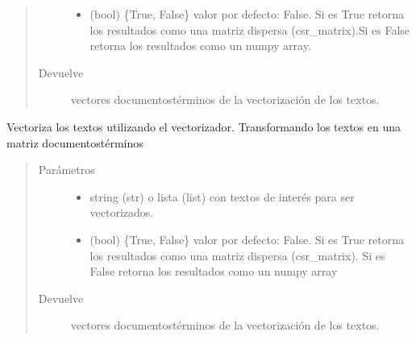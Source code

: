 \documentclass[letterpaper,10pt,openany,spanish]{sphinxmanual}
\begin{document}
\begin{fulllineitems}
\begin{fulllineitems}
\begin{quote}
\begin{description}
\begin{itemize}
\item {} 
 \textendash{} (bool) \{True, False\} valor por defecto: False. 
Si es True retorna los resultados como una matriz dispersa 
(csr\_matrix).Si es False retorna los resultados como un numpy array.

\end{itemize}

\item[{Devuelve}] \leavevmode
vectores documentos\sphinxhyphen{}términos de la vectorización de los textos.

\end{description}\end{quote}

\end{fulllineitems}


\begin{fulllineitems}
\label{\detokenize{funciones/vectorizacion:vectorizacion.VectorizadorHash.vectorizar}}
Vectoriza los textos utilizando el vectorizador. 
Transformando los textos en una matriz documentos\sphinxhyphen{}términos
\begin{quote}\begin{description}
\item[{Parámetros}] \leavevmode\begin{itemize}
\item {} 
 \textendash{} string (str) o lista (list) con textos de interés 
para ser vectorizados.

\item {} 
 \textendash{} (bool) \{True, False\} valor por defecto: False. 
Si es True retorna los resultados como una matriz dispersa 
(csr\_matrix). Si es False retorna los resultados como un numpy array

\end{itemize}

\item[{Devuelve}] \leavevmode
vectores documentos\sphinxhyphen{}términos de la vectorización de los textos.

\end{description}\end{quote}

\end{fulllineitems}


\end{fulllineitems}
\end{document}
